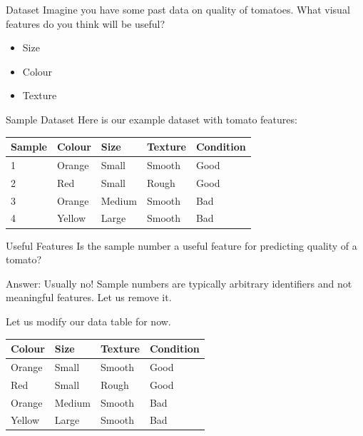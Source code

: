 \documentclass[usenames,dvipsnames]{beamer}
\begin{document}
\begin{frame}{Dataset}
Imagine you have some past data on quality of tomatoes. What visual features do you think will be useful?

\begin{itemize}
	\item \pause Size
	\item \pause Colour
	\item \pause Texture
\end{itemize}
\end{frame}
  
\begin{frame}{Sample Dataset}
Here is our example dataset with tomato features: 

\begin{table}[]
	\begin{tabular}{|l|l|l|l||l|}
		\hline 
		\textbf{Sample} & \textbf{Colour} & \textbf{Size} & \textbf{Texture} & \textbf{Condition} \\ \hline 
		1      & Orange & Small & Smooth  & Good      \\
		2      & Red    & Small  & Rough  & Good \\
		3      & Orange & Medium & Smooth & Bad \\
		4      & Yellow & Large  & Smooth & Bad \\ \hline          
	\end{tabular}
\end{table}
\end{frame}

\begin{frame}{Useful Features}
Is the sample number a useful feature for predicting quality of a tomato?

\pause Answer: Usually no! Sample numbers are typically arbitrary identifiers and not meaningful features. Let us remove it.

\pause Let us modify our data table for now.

\begin{table}[]
	\begin{tabular}{|l|l|l||l|}
		\hline 
		\textbf{Colour} & \textbf{Size} & \textbf{Texture} & \textbf{Condition} \\ \hline 
		Orange & Small & Smooth  & Good      \\
		Red    & Small  & Rough  & Good \\
		Orange & Medium & Smooth & Bad \\
		Yellow & Large  & Smooth & Bad \\ \hline 

	\end{tabular}
\end{table}
\end{frame}
\end{document}
